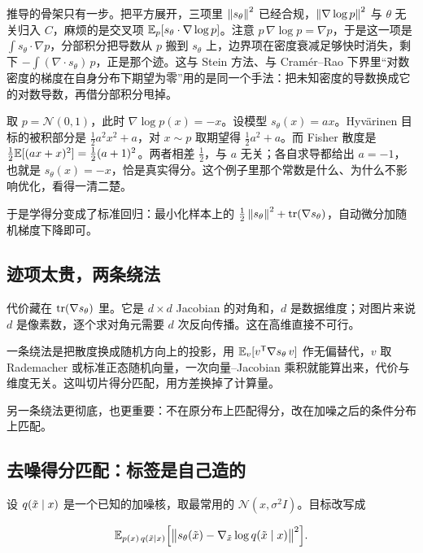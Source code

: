 推导的骨架只有一步。把平方展开，三项里 \(\left\lVert s_\theta\right\rVert^2\) 已经合规，\(\left\lVert\nabla\log p\right\rVert^2\) 与 \(\theta\) 无关归入 \(C\)，麻烦的是交叉项 \(\mathbb{E}_p[s_\theta\cdot\nabla\log p]\)。注意 \(p\,\nabla\log p=\nabla p\)，于是这一项是 \(\int s_\theta\cdot\nabla p\)，分部积分把导数从 \(p\) 搬到 \(s_\theta\) 上，边界项在密度衰减足够快时消失，剩下 \(-\int(\nabla\cdot s_\theta)\,p\)，正是那个迹。这与 Stein 方法、与 Cramér--Rao 下界里``对数密度的梯度在自身分布下期望为零''用的是同一个手法：把未知密度的导数换成它的对数导数，再借分部积分甩掉。

\begin{example}
取 \(p=\mathcal N(0,1)\)，此时 \(\nabla\log p(x)=-x\)。设模型 \(s_\theta(x)=ax\)。Hyvärinen 目标的被积部分是 \(\tfrac12a^2x^2+a\)，对 \(x\sim p\) 取期望得 \(\tfrac12a^2+a\)。而 Fisher 散度是 \(\tfrac12\mathbb{E}[(ax+x)^2]=\tfrac12(a+1)^2\)。两者相差 \(\tfrac12\)，与 \(a\) 无关；各自求导都给出 \(a=-1\)，也就是 \(s_\theta(x)=-x\)，恰是真实得分。这个例子里那个常数是什么、为什么不影响优化，看得一清二楚。
\end{example}

于是学得分变成了标准回归：最小化样本上的 \(\tfrac12\left\lVert s_\theta\right\rVert^2+\operatorname{tr}(\nabla s_\theta)\)，自动微分加随机梯度下降即可。

\subsection{迹项太贵，两条绕法}

代价藏在 \(\operatorname{tr}(\nabla s_\theta)\) 里。它是 \(d\times d\) Jacobian 的对角和，\(d\) 是数据维度；对图片来说 \(d\) 是像素数，逐个求对角元需要 \(d\) 次反向传播。这在高维直接不可行。

一条绕法是把散度换成随机方向上的投影，用 \(\mathbb{E}_v[v^{\mathsf{T}}\nabla s_\theta\,v]\) 作无偏替代，\(v\) 取 Rademacher 或标准正态随机向量，一次向量--Jacobian 乘积就能算出来，代价与维度无关。这叫切片得分匹配，用方差换掉了计算量。

另一条绕法更彻底，也更重要：不在原分布上匹配得分，改在加噪之后的条件分布上匹配。

\subsection{去噪得分匹配：标签是自己造的}

设 \(q(\tilde x\mid x)\) 是一个已知的加噪核，取最常用的 \(\mathcal N(x,\sigma^2I)\)。目标改写成

\[
\mathbb{E}_{p(x)\,q(\tilde x\mid x)}\Big[\big\lVert s_\theta(\tilde x)-\nabla_{\tilde x}\log q(\tilde x\mid x)\big\rVert^2\Big].
\]

